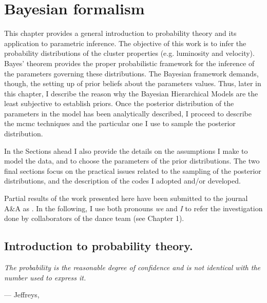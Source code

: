 \chapter{Bayesian formalism}
\label{chap:BHM}
This chapter provides a general introduction to probability theory and its application to parametric inference. The objective of this work is to infer the probability distributions of the cluster properties (e.g. luminosity and velocity). Bayes' theorem provides the proper probabilistic framework for the inference of the parameters governing these distributions. The Bayesian framework demands, though, the setting up of prior beliefs about the parameters values. Thus, later in this chapter, I  describe the reason why the Bayesian Hierarchical Models are the least subjective to establish priors. Once the posterior distribution of the parameters in the model has been analytically described, I proceed to describe the \gls{mcmc} techniques and the particular one I use to sample the posterior distribution. 

In the Sections ahead I also provide the details on the assumptions I make to model the data, and to choose the parameters of the prior distributions. The two final sections focus on the practical issues related to the sampling of the posterior distributions, and the description of the codes I adopted and/or developed.

Partial results of the work presented here have been submitted to the journal A\&A as \citet{Olivares2017}. In the following, I use both pronouns \emph{we} and \emph{I} to refer the investigation done by collaborators of the \gls{dance} team (see Chapter 1).

\section{Introduction to probability theory.}
\label{sect:introprobability}
\epigraph{\textit{The probability is the reasonable degree of confidence and is not identical with the number used to express it.}
}{--- \textup{Jeffreys}, }

